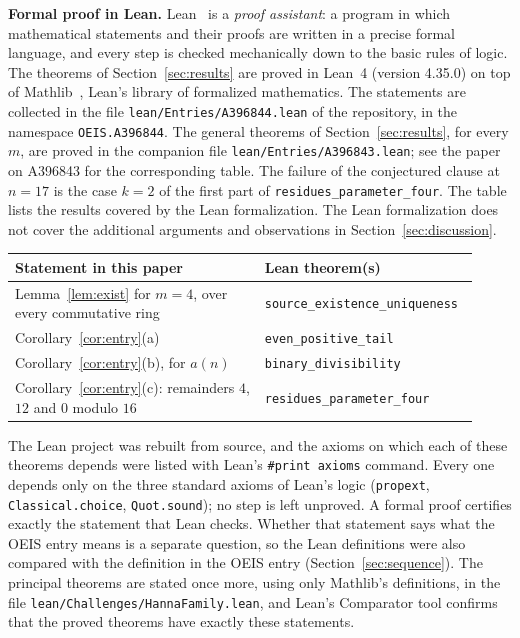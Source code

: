 \documentclass[11pt,a4paper]{article}
\theoremstyle{definition}
\theoremstyle{remark}
\newcommand{\para}[1]{\par\medskip\noindent\textbf{#1}\enspace}
\begin{document}
\para{Formal proof in Lean.}
Lean~\cite{lean} is a \emph{proof assistant}: a program in which mathematical statements and their proofs are written
in a precise formal language, and every step is checked mechanically down to the basic rules of logic. The theorems of Section~\ref{sec:results} are proved in Lean~4 (version 4.35.0) on top of
Mathlib~\cite{mathlib}, Lean's library of formalized mathematics. The statements are collected in the file \texttt{lean/Entries/A396844.lean} of the repository,
in the namespace \texttt{OEIS.A396844}. The general theorems of Section~\ref{sec:results}, for every $m$, are proved in the companion file
\texttt{lean/Entries/A396843.lean}; see the paper on A396843 for the corresponding table. The failure of the
conjectured clause at $n=17$ is the case $k=2$ of the first part of \texttt{residues\_parameter\_four}.
The table lists the results covered by the Lean formalization. The Lean formalization does not cover the additional arguments and observations in Section~\ref{sec:discussion}.
\begin{center}\small\renewcommand{\arraystretch}{1.25}
\begin{tabular}{>{\raggedright\arraybackslash}p{0.52\linewidth}>{\raggedright\arraybackslash}p{0.4\linewidth}}
\toprule
Statement in this paper & Lean theorem(s)\\
\midrule
Lemma~\ref{lem:exist} for $m=4$, over every commutative ring & \texttt{source\_\allowbreak{}existence\_\allowbreak{}uniqueness} \\
Corollary~\ref{cor:entry}(a) & \texttt{even\_\allowbreak{}positive\_\allowbreak{}tail} \\
Corollary~\ref{cor:entry}(b), for $a(n)$ & \texttt{binary\_\allowbreak{}divisibility} \\
Corollary~\ref{cor:entry}(c): remainders $4$, $12$ and $0$ modulo $16$ & \texttt{residues\_\allowbreak{}parameter\_\allowbreak{}four} \\
\bottomrule
\end{tabular}
\end{center}
The Lean project was rebuilt from source, and the axioms on which each of these theorems depends were listed with
Lean's \texttt{\#print axioms} command. Every one depends only on the three standard axioms of Lean's logic
(\texttt{propext}, \texttt{Classical.choice}, \texttt{Quot.sound}); no step is left unproved. A formal proof certifies
exactly the statement that Lean checks. Whether that statement says what the OEIS entry means is a separate question,
so the Lean definitions were also compared with the definition in the OEIS entry
(Section~\ref{sec:sequence}). The principal theorems are stated once more, using only Mathlib's definitions, in the
file \texttt{lean/Challenges/HannaFamily.lean}, and Lean's Comparator tool confirms that the
proved theorems have exactly these statements.
\end{document}
